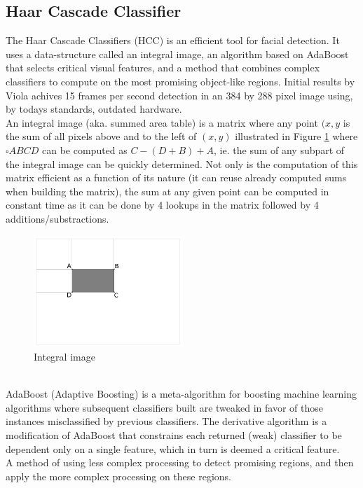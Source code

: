 \subsection{Haar Cascade Classifier}\label{sec:hcc}
%
The Haar Cascade Classifiers (HCC)\cite{viola01,lienhart01,schmidt01,schmidt02} is an efficient tool for facial detection. It uses a data-structure called an integral image, an algorithm based on AdaBoost that selects critical visual features, and a method that combines complex classifiers to compute on the most promising object-like regions. Initial results by Viola\cite{viola01} achives 15 frames per second detection in an 384 by 288 pixel image using, by todays standards, outdated hardware.\\
%
An integral image (aka. summed area table) is a matrix where any point $(x,y$ is the sum of all pixels above and to the left of $(x,y)$ illustrated in Figure \ref{fig:integral_img} where $\square ABCD$ can be computed as $C-(D+B)+A$, ie. the sum of any subpart of the integral image can be quickly determined. Not only is the computation of this matrix efficient as a function of its nature (it can reuse already computed sums when building the matrix), the sum at any given point can be computed in constant time as it can be done by 4 lookups in the matrix followed by 4 additions/substractions.
%
\begin{figure}[h]
     \centering
     \includegraphics[width=0.50\textwidth]{img/integral_image.png}
     \caption{Integral image}\label{fig:integral_img}
\end{figure}\\
%
AdaBoost (Adaptive Boosting) is a meta-algorithm for boosting machine learning algorithms where subsequent classifiers built are tweaked in favor of those instances misclassified by previous classifiers. The derivative algorithm is a modification of AdaBoost that constrains each returned (weak) classifier to be dependent only on a single feature, which in turn is deemed a critical feature.\\
A method of using less complex processing to detect promising regions, and then apply the more complex processing on these regions.
%
